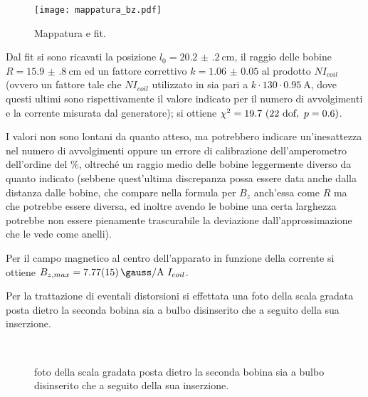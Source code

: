 	\begin{figure}[H]
		\centering
		\texttt{[image: mappatura\_bz.pdf]}
		\caption{Mappatura e fit.}
		\label{fig:fit1}
	\end{figure}

	Dal fit si sono ricavati la posizione $l_0 = \SI{20.2(2)}{\cm} $, il raggio
	delle bobine $R = \SI{15.9(8)}{\cm}$ ed un fattore correttivo $k = \num{1.06(5)}$
	al prodotto $N I_{coil}$ (ovvero un fattore tale che $N I_{coil}$ utilizzato in 
	sia pari a $k \cdot  130 \cdot  \SI{0.95}{\A}$, dove questi ultimi sono rispettivamente il valore
	indicato per il numero di avvolgimenti e la corrente misurata dal generatore);
	si ottiene $\chi^2 = 19.7 \ (22 \text{ dof} , \  p = 0.6)$.

	I valori non sono lontani da quanto atteso, ma potrebbero indicare un'inesattezza
	nel numero di avvolgimenti oppure un errore di calibrazione dell'amperometro dell'ordine del \%,
	oltreché un raggio medio delle bobine leggermente diverso da quanto indicato
	(sebbene quest'ultima discrepanza possa essere data anche dalla distanza dalle bobine, che compare nella
	formula per $B_z$ anch'essa come $R$ ma che potrebbe essere diversa, ed inoltre avendo le bobine
	una certa larghezza potrebbe non essere pienamente trascurabile la deviazione
	dall'approssimazione che le vede come anelli).

	Per il campo magnetico al centro dell'apparato in funzione della corrente si ottiene
	$B_{z,max} = \SI{7.77(15)}{\gauss\per\A} \ I_{coil}$.

	Per la trattazione di eventali distorsioni
	si effettata una foto della scala gradata posta dietro la seconda bobina sia
	a bulbo disinserito che a seguito della sua inserzione.
	\begin{figure}[hb]
		\centering
		\\
		\caption{foto della scala gradata posta dietro la seconda bobina sia a bulbo disinserito che a seguito della sua inserzione.}
		\label{fig:scala}
	\end{figure}
